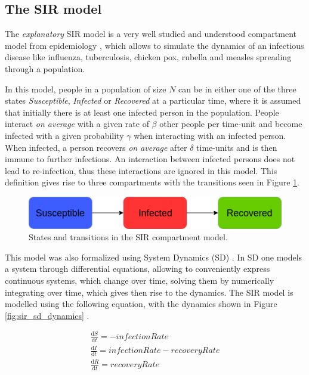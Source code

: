 \subsection{The SIR model}
\label{sec:sir_model}

The \textit{explanatory} SIR model is a very well studied and understood compartment model from epidemiology \cite{kermack_contribution_1927}, which allows to simulate the dynamics of an infectious disease like influenza, tuberculosis, chicken pox, rubella and measles spreading through a population.

In this model, people in a population of size $N$ can be in either one of the three states \textit{Susceptible}, \textit{Infected} or \textit{Recovered} at a particular time, where it is assumed that initially there is at least one infected person in the population. People interact \textit{on average} with a given rate of $\beta$ other people per time-unit and become infected with a given probability $\gamma$ when interacting with an infected person. When infected, a person recovers \textit{on average} after $\delta$ time-units and is then immune to further infections. An interaction between infected persons does not lead to re-infection, thus these interactions are ignored in this model. This definition gives rise to three compartments with the transitions seen in Figure \ref{fig:sir_transitions}.

\begin{figure}
	\centering
	\includegraphics[width=.7\textwidth, angle=0]{./fig/timedriven/SIR_transitions.png}
	\caption{States and transitions in the SIR compartment model.}
	\label{fig:sir_transitions}
\end{figure}

This model was also formalized using System Dynamics (SD) \cite{porter_industrial_1962}. In SD one models a system through differential equations, allowing to conveniently express continuous systems, which change over time, solving them by numerically integrating over time, which gives then rise to the dynamics. The SIR model is modelled using the following equation, with the dynamics shown in Figure \ref{fig:sir_sd_dynamics} .

\begin{equation}
\begin{aligned}
\frac{\mathrm d S}{\mathrm d t} = -infectionRate \\
\frac{\mathrm d I}{\mathrm d t} = infectionRate - recoveryRate \\
\frac{\mathrm d R}{\mathrm d t} = recoveryRate 
\end{aligned}
\end{equation}

